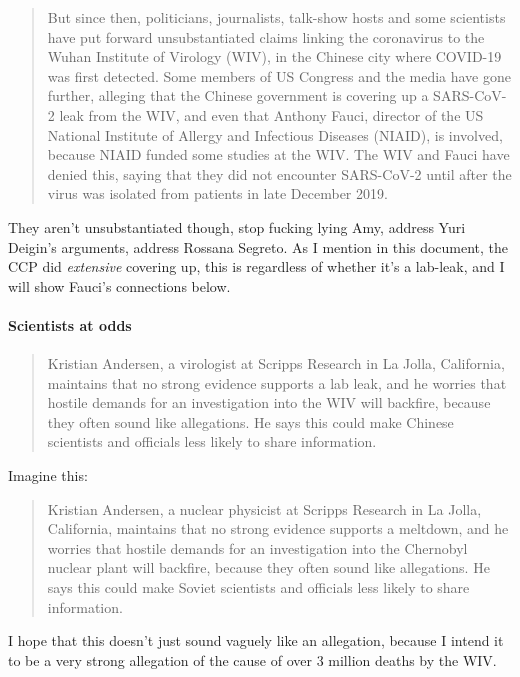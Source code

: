 \documentclass[11pt]{article}
\begin{document}
\begin{quote}
But since then, politicians, journalists, talk-show hosts and some scientists have put forward unsubstantiated claims linking the coronavirus to the Wuhan Institute of Virology (WIV), in the Chinese city where COVID-19 was first detected. Some members of US Congress and the media have gone further, alleging that the Chinese government is covering up a SARS-CoV-2 leak from the WIV, and even that Anthony Fauci, director of the US National Institute of Allergy and Infectious Diseases (NIAID), is involved, because NIAID funded some studies at the WIV. The WIV and Fauci have denied this, saying that they did not encounter SARS-CoV-2 until after the virus was isolated from patients in late December 2019.
\end{quote}
They aren't unsubstantiated though, stop fucking lying Amy, address Yuri Deigin's arguments, address Rossana Segreto. As I mention in this document, the CCP did \emph{extensive} covering up, this is regardless of whether it's a lab-leak, and I will show Fauci's connections below.

\paragraph{Scientists at odds}
\label{sec:org09d81b6}
\begin{quote}
Kristian Andersen, a virologist at Scripps Research in La Jolla, California, maintains that no strong evidence supports a lab leak, and he worries that hostile demands for an investigation into the WIV will backfire, because they often sound like allegations. He says this could make Chinese scientists and officials less likely to share information.
\end{quote}
Imagine this:
\begin{quote}
Kristian Andersen, a nuclear physicist at Scripps Research in La Jolla, California, maintains that no strong evidence supports a meltdown, and he worries that hostile demands for an investigation into the Chernobyl nuclear plant will backfire, because they often sound like allegations. He says this could make Soviet scientists and officials less likely to share information.
\end{quote}
I hope that this doesn't just sound vaguely like an allegation, because I intend it to be a very strong allegation of the cause of over 3 million deaths by the WIV.
\end{document}
